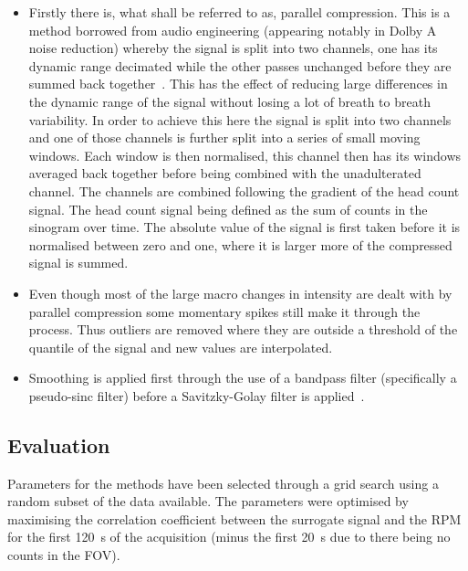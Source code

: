             \begin{itemize}
                \item Firstly there is, what shall be referred to as, parallel compression. This is a method borrowed from audio engineering (appearing notably in Dolby A noise reduction) whereby the signal is split into two channels, one has its dynamic range decimated while the other passes unchanged before they are summed back together~\cite{Izhaki2012MixingTools}. This has the effect of reducing large differences in the dynamic range of the signal without losing a lot of breath to breath variability. In order to achieve this here the signal is split into two channels and one of those channels is further split into a series of small moving windows. Each window is then normalised, this channel then has its windows averaged back together before being combined with the unadulterated channel. The channels are combined following the gradient of the head count signal. The head count signal being defined as the sum of counts in the sinogram over time. The absolute value of the signal is first taken before it is normalised between zero and one, where it is larger more of the compressed signal is summed.
                
                \item Even though most of the large macro changes in intensity are dealt with by parallel compression some momentary spikes still make it through the process. Thus outliers are removed where they are outside a threshold of the quantile of the signal and new values are interpolated.
                
                \item Smoothing is applied first through the use of a bandpass filter (specifically a pseudo-sinc filter) before a Savitzky-Golay filter is applied~\cite{Savitzky1964SmoothingProcedures}.
            \end{itemize}
        
            
    \subsection{Evaluation} \label{sec:evaluation}
        Parameters for the methods have been selected through a grid search using a random subset of the data available. The parameters were optimised by maximising the correlation coefficient between the surrogate signal and the \gls{RPM} for the first \SI{120}{\second} of the acquisition (minus the first \SI{20}{\second} due to there being no counts in the \gls{FOV}).
        
